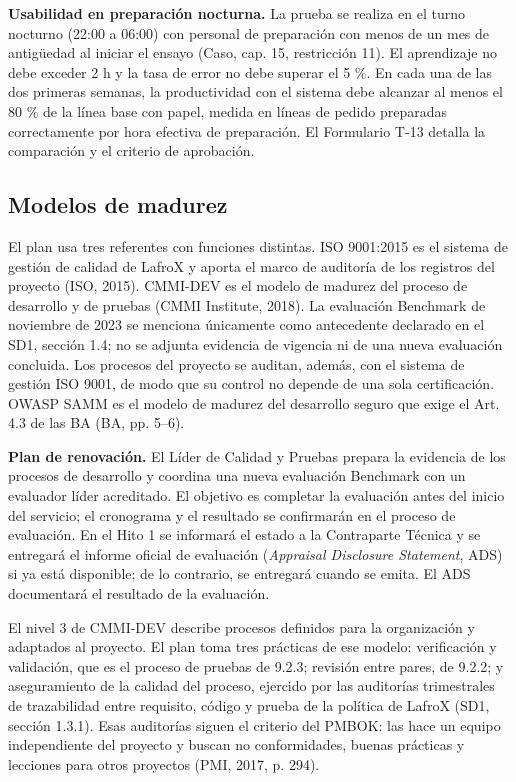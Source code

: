 \textbf{Usabilidad en preparación nocturna.} La prueba se realiza en el turno nocturno (22:00 a 06:00) con personal de preparación con menos de un mes de antigüedad al iniciar el ensayo (Caso, cap. 15, restricción 11). El aprendizaje no debe exceder 2 h y la tasa de error no debe superar el 5 \%. En cada una de las dos primeras semanas, la productividad con el sistema debe alcanzar al menos el 80 \% de la línea base con papel, medida en líneas de pedido preparadas correctamente por hora efectiva de preparación. El Formulario T-13 detalla la comparación y el criterio de aprobación.

\subsection{Modelos de madurez}

El plan usa tres referentes con funciones distintas. ISO 9001:2015 es el sistema de gestión de calidad de LafroX y aporta el marco de auditoría de los registros del proyecto (ISO, 2015). CMMI-DEV es el modelo de madurez del proceso de desarrollo y de pruebas (CMMI Institute, 2018). La evaluación Benchmark de noviembre de 2023 se menciona únicamente como antecedente declarado en el SD1, sección 1.4; no se adjunta evidencia de vigencia ni de una nueva evaluación concluida. Los procesos del proyecto se auditan, además, con el sistema de gestión ISO 9001, de modo que su control no depende de una sola certificación. OWASP SAMM es el modelo de madurez del desarrollo seguro que exige el Art. 4.3 de las BA (BA, pp. 5--6).

\textbf{Plan de renovación.} El Líder de Calidad y Pruebas prepara la evidencia de los procesos de desarrollo y coordina una nueva evaluación Benchmark con un evaluador líder acreditado. El objetivo es completar la evaluación antes del inicio del servicio; el cronograma y el resultado se confirmarán en el proceso de evaluación. En el Hito 1 se informará el estado a la Contraparte Técnica y se entregará el informe oficial de evaluación (\textit{Appraisal Disclosure Statement}, ADS) si ya está disponible; de lo contrario, se entregará cuando se emita. El ADS documentará el resultado de la evaluación.

El nivel 3 de CMMI-DEV describe procesos definidos para la organización y adaptados al proyecto. El plan toma tres prácticas de ese modelo: verificación y validación, que es el proceso de pruebas de 9.2.3; revisión entre pares, de 9.2.2; y aseguramiento de la calidad del proceso, ejercido por las auditorías trimestrales de trazabilidad entre requisito, código y prueba de la política de LafroX (SD1, sección 1.3.1). Esas auditorías siguen el criterio del PMBOK: las hace un equipo independiente del proyecto y buscan no conformidades, buenas prácticas y lecciones para otros proyectos (PMI, 2017, p. 294).

